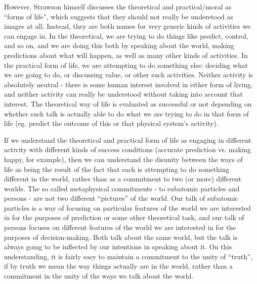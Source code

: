\documentclass[phd,12pt,oneside,paper=letterpaper]{ubcthesis}
\begin{document}
However, Strawson himself discusses the theoretical and practical/moral as ``forms of life'', which suggests that they should not really be understood as images at all. Instead, they are both names for very generic kinds of activities we can engage in. In the theoretical, we are trying to do things like predict, control, and so on, and we are doing this both by speaking about the world, making predictions about what will happen, as well as many other kinds of activities. In the practical form of life, we are attempting to do something else: deciding what we are going to do, or discussing value, or other such activities. Neither activity is absolutely neutral - there is some human interest involved in either form of living, and neither activity can really be understood without taking into account that interest. The theoretical way of life is evaluated as successful or not depending on whether such talk is actually able to do what we are trying to do in that form of life (eg. predict the outcome of this or that physical system's activity). 

If we understand the theoretical and practical form of life as engaging in different activity with different kinds of success conditions (accurate prediction vs. making happy, for example), then we can understand the disunity between the ways of life as being the result of the fact that each is attempting to do something different in the world, rather than as a commitment to two (or more) different worlds. The so called metaphysical commitments - to subatomic particles and persons - are not two different ``pictures'' of the world. Our talk of subatomic particles is a way of focusing on particular features of the world we are interested in for the purposes of prediction or some other theoretical task, and our talk of persons focuses on different features of the world we are interested in for the purposes of decision-making. Both talk about the same world, but the talk is always going to be inflected by our intentions in speaking about it. On this understanding, it is fairly easy to maintain a commitment to the unity of ``truth'', if by truth we mean the way things actually are in the world, rather than a commitment in the unity of the ways we talk about the world. 
\end{document}
